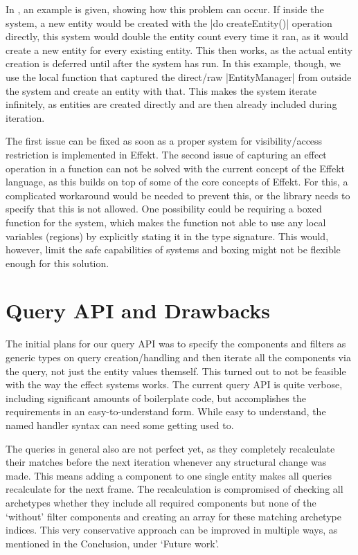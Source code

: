 In , an example is given, showing how this problem can occur. If inside the system, a new entity would be created with the |do createEntity()| operation directly, this system would double the entity count every time it ran, as it would create a new entity for every existing entity. This then works, as the actual entity creation is deferred until after the system has run. In this example, though, we use the local function that captured the direct/raw |EntityManager| from outside the system and create an entity with that. This makes the system iterate infinitely, as entities are created directly and are then already included during iteration.

The first issue can be fixed as soon as a proper system for visibility/access restriction is implemented in Effekt. The second issue of capturing an effect operation in a function can not be solved with the current concept of the Effekt language, as this builds on top of some of the core concepts of Effekt. For this, a complicated workaround would be needed to prevent this, or the library needs to specify that this is not allowed. One possibility could be requiring a boxed function for the system, which makes the function not able to use any local variables (regions) by explicitly stating it in the type signature. This would, however, limit the safe capabilities of systems and boxing might not be flexible enough for this solution.

\section{Query API and Drawbacks}

The initial plans for our query API was to specify the components and filters as generic types on query creation/handling and then iterate all the components via the query, not just the entity values themself. This turned out to not be feasible with the way the effect systems works. The current query API is quite verbose, including significant amounts of boilerplate code, but accomplishes the requirements in an easy-to-understand form. While easy to understand, the named handler syntax can need some getting used to.

The queries in general also are not perfect yet, as they completely recalculate their matches before the next iteration whenever any structural change was made. This means adding a component to one single entity makes all queries recalculate for the next frame. The recalculation is compromised of checking all archetypes whether they include all required components but none of the `without' filter components and creating an array for these matching archetype indices. This very conservative approach can be improved in multiple ways, as mentioned in the Conclusion, under `Future work'.

